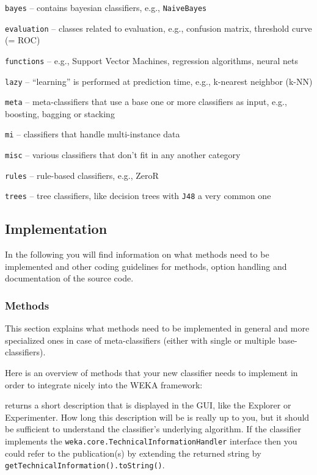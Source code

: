 \begin{tight_itemize}
  \item \texttt{bayes} -- contains bayesian classifiers, e.g.,
\texttt{NaiveBayes}
  \item \texttt{evaluation} -- classes related to evaluation, e.g., confusion
matrix, threshold curve (= ROC)
  \item \texttt{functions} -- e.g., Support Vector Machines, regression
algorithms, neural nets
  \item \texttt{lazy} -- ``learning'' is performed at prediction time, e.g.,
k-nearest neighbor (k-NN)
  \item \texttt{meta} -- meta-classifiers that use a base one or more
classifiers as input, e.g., boosting, bagging or stacking
  \item \texttt{mi} -- classifiers that handle multi-instance data
  \item \texttt{misc} -- various classifiers that don't fit in any another
category
  \item \texttt{rules} -- rule-based classifiers, e.g., ZeroR
  \item \texttt{trees} -- tree classifiers, like decision trees with
\texttt{J48} a very common one
\end{tight_itemize}

\newpage

\subsection{Implementation}
In the following you will find information on what methods need to be
implemented and other coding guidelines for methods, option handling and
documentation of the source code.

\subsubsection{Methods}
\label{classifier_methods}
This section explains what methods need to be implemented in general and more
specialized ones in case of meta-classifiers (either with single or multiple
base-classifiers).

Here is an overview of methods that your new classifier needs to implement in
order to integrate nicely into the WEKA framework:

returns a short description that is displayed in the GUI, like the Explorer or
Experimenter. How long this description will be is really up to you, but it
should be sufficient to understand the classifier's underlying algorithm. If the
classifier implements the \texttt{weka.core.TechnicalInformationHandler}
interface then you could refer to the publication(s) by extending the returned
string by \texttt{getTechnicalInformation().toString()}.

